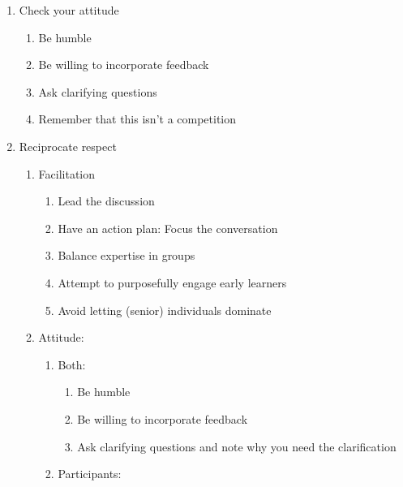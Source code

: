 \documentclass[
  11pt,
]{article}
\providecommand{\tightlist}{%
  \setlength{\itemsep}{0pt}\setlength{\parskip}{0pt}}
\begin{document}
\begin{enumerate}
\def\labelenumi{\arabic{enumi}.}
\setcounter{enumi}{3}
\tightlist
\item
  Check your attitude

  \begin{enumerate}
  \def\labelenumii{\alph{enumii}.}
  \tightlist
  \item
    Be humble
  \item
    Be willing to incorporate feedback
  \item
    Ask clarifying questions
  \item
    Remember that this isn't a competition
  \end{enumerate}
\item
  Reciprocate respect

  \begin{enumerate}
  \def\labelenumii{\alph{enumii}.}
  \tightlist
  \item
    Facilitation

    \begin{enumerate}
    \def\labelenumiii{\roman{enumiii}.}
    \tightlist
    \item
      Lead the discussion
    \item
      Have an action plan: Focus the conversation
    \item
      Balance expertise in groups
    \item
      Attempt to purposefully engage early learners
    \item
      Avoid letting (senior) individuals dominate
    \end{enumerate}
  \item
    Attitude:

    \begin{enumerate}
    \def\labelenumiii{\roman{enumiii}.}
    \tightlist
    \item
      Both:

      \begin{enumerate}
      \def\labelenumiv{\arabic{enumiv}.}
      \tightlist
      \item
        Be humble
      \item
        Be willing to incorporate feedback
      \item
        Ask clarifying questions and note why you need the clarification
      \end{enumerate}
    \item
      Participants:


\end{enumerate}
\end{enumerate}
\end{enumerate}
\end{document}
